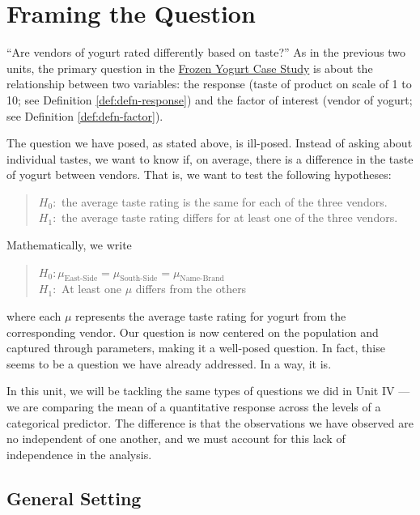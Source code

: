\documentclass[]{book}
\theoremstyle{plain}
\theoremstyle{mydefn}
\theoremstyle{myexmpl}
\theoremstyle{remark}
\begin{document}
\chapter{Framing the Question}\label{Blockquestions}

``Are vendors of yogurt rated differently based on taste?'' As in the
previous two units, the primary question in the
\protect\hyperlink{CaseYogurt}{Frozen Yogurt Case Study} is about the
relationship between two variables: the response (taste of product on
scale of 1 to 10; see Definition \ref{def:defn-response}) and the factor
of interest (vendor of yogurt; see Definition \ref{def:defn-factor}).

The question we have posed, as stated above, is ill-posed. Instead of
asking about individual tastes, we want to know if, on average, there is
a difference in the taste of yogurt between vendors. That is, we want to
test the following hypotheses:

\begin{quote}
\(H_0:\) the average taste rating is the same for each of the three
vendors.\\
\(H_1:\) the average taste rating differs for at least one of the three
vendors.
\end{quote}

Mathematically, we write

\begin{quote}
\(H_0: \mu_{\text{East-Side}} = \mu_{\text{South-Side}} = \mu_{\text{Name-Brand}}\)\\
\(H_1:\) At least one \(\mu\) differs from the others
\end{quote}

where each \(\mu\) represents the average taste rating for yogurt from
the corresponding vendor. Our question is now centered on the population
and captured through parameters, making it a well-posed question. In
fact, thise seems to be a question we have already addressed. In a way,
it is.

In this unit, we will be tackling the same types of questions we did in
Unit IV --- we are comparing the mean of a quantitative response across
the levels of a categorical predictor. The difference is that the
observations we have observed are no independent of one another, and we
must account for this lack of independence in the analysis.

\section{General Setting}\label{general-setting-1}
\end{document}
